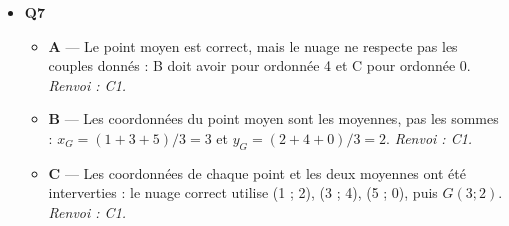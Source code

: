 \begin{itemize}
\begin{itemize}
    \item \textbf{B} — Une cause commune explique la variation conjointe sans rendre nécessaire une action directe de X sur Y. Une cause commune Z peut faire varier X et Y ensemble et créer une corrélation sans causalité directe entre X et Y. \emph{Renvoi : C5.}
    \item \textbf{D} — La variable cachée fournit précisément un mécanisme explicatif à l'association mesurée entre X et Y. Une cause commune Z peut faire varier X et Y ensemble et créer une corrélation sans causalité directe entre X et Y. \emph{Renvoi : C5.}
  \end{itemize}
  \item \textbf{Q7}
  \begin{itemize}
    \item \textbf{A} — Le point moyen est correct, mais le nuage ne respecte pas les couples donnés : B doit avoir pour ordonnée 4 et C pour ordonnée 0. \emph{Renvoi : C1.}
    \item \textbf{B} — Les coordonnées du point moyen sont les moyennes, pas les sommes : $x_G=(1+3+5)/3=3$ et $y_G=(2+4+0)/3=2$. \emph{Renvoi : C1.}
    \item \textbf{C} — Les coordonnées de chaque point et les deux moyennes ont été interverties : le nuage correct utilise (1 ; 2), (3 ; 4), (5 ; 0), puis $G(3 ; 2)$. \emph{Renvoi : C1.}
  \end{itemize}
\end{itemize}
\fi
